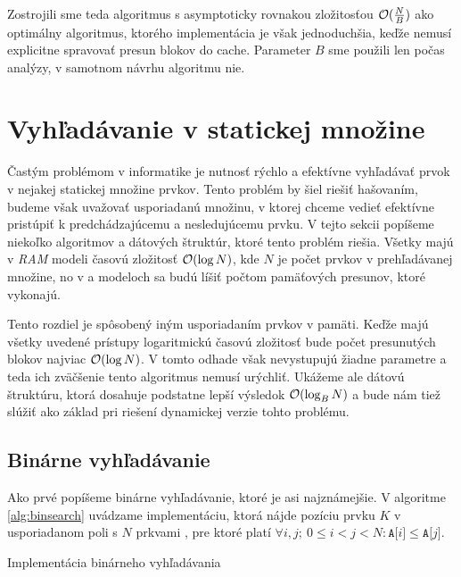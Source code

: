 Zostrojili sme teda \obliv algoritmus s asymptoticky rovnakou zložitosťou $\mathcal{O}(\frac{N}{B})$ ako optimálny \aware algoritmus, ktorého implementácia je však jednoduchšia, keďže nemusí explicitne spravovať presun blokov do cache. Parameter $B$ sme použili len počas analýzy, v samotnom návrhu algoritmu nie.

\section{Vyhľadávanie v statickej množine}
Častým problémom v informatike je nutnosť rýchlo a efektívne vyhľadávať prvok v nejakej statickej množine prvkov. Tento problém by šiel riešiť hašovaním, budeme však uvažovať usporiadanú množinu, v ktorej chceme vedieť efektívne pristúpiť k predchádzajúcemu a nesledujúcemu prvku. V tejto sekcii popíšeme niekoľko algoritmov a dátových štruktúr, ktoré tento problém riešia. Všetky majú v \emph{RAM} modeli časovú zložitosť $\mathcal{O}(\log N)$, kde $N$ je počet prvkov v prehľadávanej množine, no v \aware a \obliv modeloch sa budú líšiť počtom pamäťových presunov, ktoré vykonajú.

Tento rozdiel je spôsobený iným usporiadaním prvkov v pamäti. Keďže majú všetky uvedené prístupy logaritmickú časovú zložitosť bude počet presunutých blokov najviac $\mathcal{O}(\log{N})$. V tomto odhade však nevystupujú žiadne parametre \cache a teda ich zväčšenie tento algoritmus nemusí urýchliť. Ukážeme ale dátovú štruktúru, ktorá dosahuje podstatne lepší výsledok $\mathcal{O}(\log_B{N})$ a bude nám tiež slúžiť ako základ pri riešení dynamickej verzie tohto problému.

\subsection{Binárne vyhľadávanie}
Ako prvé popíšeme binárne vyhľadávanie, ktoré je asi najznámejšie. V algoritme \ref{alg:binsearch} uvádzame implementáciu, ktorá nájde pozíciu prvku $K$ v usporiadanom poli  s $N$ prkvami , pre ktoré platí $\forall i,j;~ 0\le i < j < N: \texttt{A[}i\texttt{]} \le \texttt{A[}j\texttt{]}$.

\begin{algorithm}
    \caption{Implementácia binárneho vyhľadávania}
    \label{alg:binsearch}
    \begin{algorithmic}[1]
                    \State {}
                \Else
                \EndIf
            \EndWhile
            \State {}
        \EndFunction
    \end{algorithmic}
\end{algorithm}

